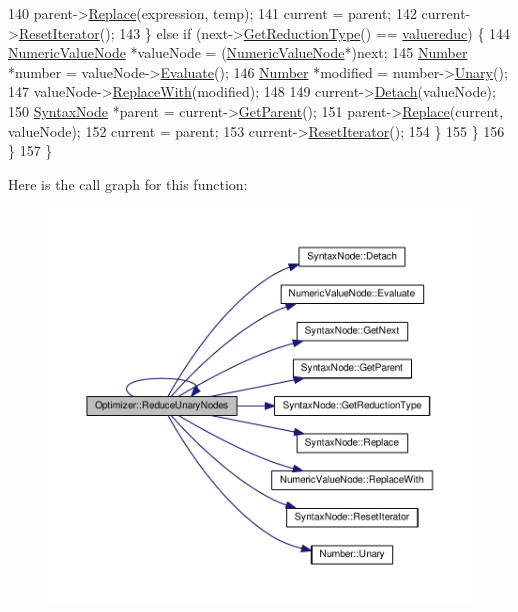\begin{DoxyCode}
140                 parent->\hyperlink{classSyntaxNode_a2797ff5eb05f3a36ae1be41b70105e05}{Replace}(expression, temp);
141                 current = parent;
142                 current->\hyperlink{classSyntaxNode_ac51307368fb255aa760b99e137178c89}{ResetIterator}();
143             \} \textcolor{keywordflow}{else} \textcolor{keywordflow}{if} (next->\hyperlink{classSyntaxNode_a5384fc779eee947b5e09bf2adb6cc606}{GetReductionType}() == \hyperlink{nodes_8h_ab321a69ad5704b704b8dd9e1b3984a29ab28eba4ada38a77030f8d532ee98a360}{valuereduc}) \{
144                 \hyperlink{classNumericValueNode}{NumericValueNode} *valueNode = (\hyperlink{classNumericValueNode}{NumericValueNode}*)next;
145                 \hyperlink{structNumber}{Number} *number = valueNode->\hyperlink{classNumericValueNode_abdd2e6fd1723488a24a645fec481a971}{Evaluate}();
146                 \hyperlink{structNumber}{Number} *modified = number->\hyperlink{structNumber_a4283e401f772614fc566db78087cf860}{Unary}();
147                 valueNode->\hyperlink{classNumericValueNode_ab46507560d70b5e4396f1f5fba5368ec}{ReplaceWith}(modified);
148 
149                 current->\hyperlink{classSyntaxNode_ae57f629a5c5fa0994f036c105396da69}{Detach}(valueNode);
150                 \hyperlink{classSyntaxNode}{SyntaxNode} *parent = current->\hyperlink{classSyntaxNode_a4a85fd710ad44edbc5b3ac625c10cd08}{GetParent}();
151                 parent->\hyperlink{classSyntaxNode_a2797ff5eb05f3a36ae1be41b70105e05}{Replace}(current, valueNode);
152                 current = parent;
153                 current->\hyperlink{classSyntaxNode_ac51307368fb255aa760b99e137178c89}{ResetIterator}();
154             \}
155         \}
156     \}
157 \}
\end{DoxyCode}


Here is the call graph for this function\+:\nopagebreak
\begin{figure}[H]
\begin{center}
\leavevmode
\includegraphics[width=350pt]{classOptimizer_aef8d80bb6301ee01a7ed271148438733_cgraph}
\end{center}
\end{figure}




